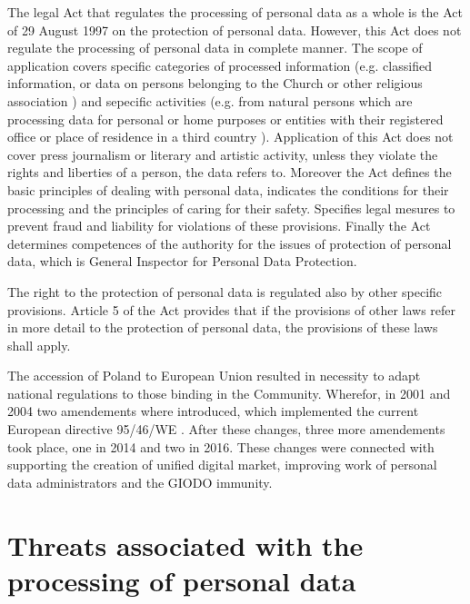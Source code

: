 \documentclass[en, noamssymb]{mgr}
\begin{document}
\indent The legal Act that regulates the processing of personal data as a whole is the Act of 29 August 1997 on the protection of personal data. However, this Act does not regulate the processing of personal data in complete manner. The scope of application covers specific categories of processed information (e.g. classified information, or data on persons belonging to the Church or other religious association \cite{prawo_odo}) and sepecific activities (e.g. from natural persons which are processing data for personal or home purposes or entities with their registered office or place of  residence in a third country \cite{prawo_odo}). Application of this Act does not cover press journalism or literary and artistic activity, unless they violate the rights and liberties of a person, the data refers to. Moreover the Act defines the basic principles of dealing with personal data, indicates the conditions for their processing and the principles of caring for their safety. Specifies legal mesures to prevent fraud and liability for violations of these provisions. Finally the Act determines competences of the authority for the issues of protection of personal data, which is General Inspector for Personal Data Protection.

\indent The right to the protection of personal data is regulated also by other specific provisions. Article 5 of the Act provides that if the provisions of other laws refer in more detail to the protection of personal data, the provisions of these laws shall apply.

\indent The accession of Poland to European Union resulted in necessity to adapt national regulations to those binding in the Community. Wherefor, in 2001 and 2004 two amendements where introduced, which implemented the current European directive 95/46/WE \cite{prawo_odo}. After these changes, three more amendements took place, one in 2014 and two in 2016. These changes were connected with supporting the creation of unified digital market, improving work of personal data administrators and the GIODO immunity.



\section{Threats associated with the processing of personal data}
\end{document}
